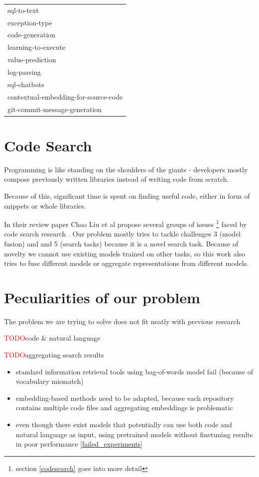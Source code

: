\documentclass[longabstract,mgr,english]{iithesis}
\newcommand{\TODO}{\textcolor{red}{\huge{TODO}}}
\begin{document}
\begin{table}[htbp]
\begin{tabular}{|l|}
                                   sql-to-text \\
                                exception-type \\
                               code-generation \\
                           learning-to-execute \\
                              value-prediction \\
                                   log-parsing \\
                                  sql-chatbots \\
          contextual-embedding-for-source-code \\
                 git-commit-message-generation \\
\bottomrule
\hline
\end{tabular}
\end{table}


\section{Code Search}


Programming is like standing on the shoulders of the giants - developers mostly compose previously written libraries instead of writing code from scratch.

Because of this, significant time is spent on finding useful code, either in form of snippets or whole libraries.

In their review paper Chao Liu et al \cite{code_search} propose several groups of issues \footnote{section \ref{codesearch} goes into more detail} faced by code search research . Our problem mostly tries to tackle challenges 3 (model fusion) and  and 5 (search tasks) because it is a novel search task. 
Because of novelty we cannot use existing models trained on other tasks, so this work also tries to fuse different models or aggregate representations from different models.

\section{Peculiarities of our problem}


The problem we are trying to solve does not fit neatly with previous research

\TODO code \& natural language

\TODO aggregating search results


\begin{itemize}
\item standard information retrieval tools using bag-of-words model fail (because of vocabulary mismatch)
\item embedding-based methods need to be adapted, because each repository contains multiple code files
  and aggregating embeddings is problematic
\item even though there exist models that potentially can use both code  and
  natural language as input, using pretrained models without finetuning results
  in poor performance \ref{failed_experiments} 
\end{itemize}
\end{document}
